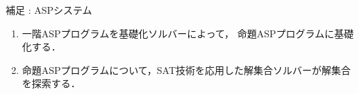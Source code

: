 \begin{frame}{補足 : ASPシステム}
 
 \vspace{-0.5cm}

 \begin{figure}[htbp]
  \centering
  
 \end{figure}

 \vspace{-0.5cm}

 \begin{exampleblock}{}
  \begin{enumerate}
   \item 一階ASPプログラムを基礎化ソルバーによって，
		 命題ASPプログラムに\alert{基礎化}する．
   \item 命題ASPプログラムについて，SAT技術を応用した解集合ソルバーが解集合を探索する．
  \end{enumerate}
 \end{exampleblock}

\end{frame}
